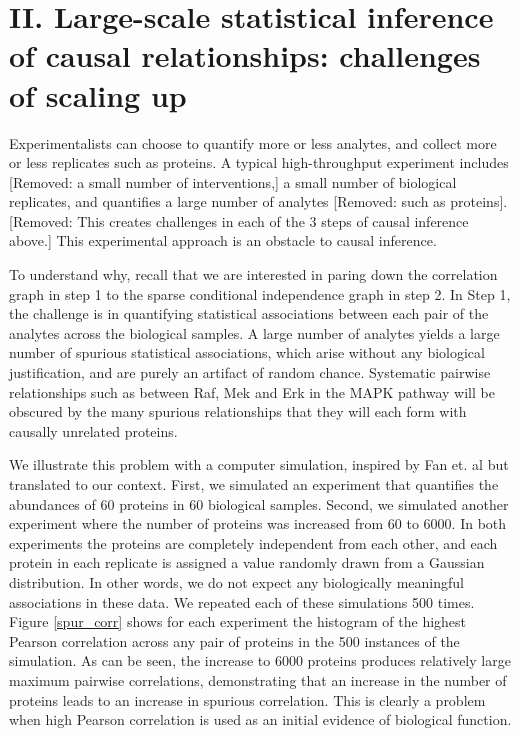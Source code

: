 \documentclass[journal=jacsat,manuscript=article]{achemso}
\def\added#1{{\color{blue} #1}}
\def\removed#1{{\color{magenta}[Removed: #1]}}
\begin{document}
\section{II. Large-scale statistical inference of causal relationships: challenges of scaling up}

\added{Experimentalists can choose to quantify more or less analytes, and collect more or less replicates such as proteins.} A typical high-throughput experiment includes \removed{a small number of interventions,} a small number of biological replicates, and quantifies a large number of analytes \removed{such as proteins}. \removed{This creates challenges in each of the 3 steps of causal inference above.}  \added{This experimental approach is an obstacle to causal inference.}

\added{To understand why, recall that we are interested in paring down the correlation graph in step 1 to the sparse conditional independence graph in step 2.}  In Step 1, the challenge is in quantifying statistical associations between each pair of the analytes across the biological samples. A large number of analytes yields a large number of spurious statistical associations, which arise without any biological justification, and are purely an artifact of random chance. Systematic pairwise relationships such as between Raf, Mek and Erk in the MAPK pathway will be obscured by the many spurious relationships that they will each form with causally unrelated proteins.

We illustrate this problem with a computer simulation, inspired by Fan et. al\cite{fan2014challenges} but translated to our context. First, we simulated an experiment that quantifies the abundances of 60 proteins in 60 biological samples. Second, we simulated another experiment where the number of proteins was increased from 60 to 6000. In both experiments the proteins are completely independent from each other, and each protein in each replicate is assigned a value randomly drawn from a Gaussian distribution. In other words, we do not expect any biologically meaningful associations in these data. We repeated each of these simulations 500 times. Figure \ref{spur_corr} shows for each experiment the histogram of the highest Pearson correlation across any pair of proteins in the 500 instances of the simulation. As can be seen, the increase to 6000 proteins produces relatively large maximum pairwise correlations, demonstrating that an increase in the number of proteins leads to an increase in spurious correlation.  This is clearly a problem when high Pearson correlation is used as an initial evidence of biological function.
\end{document}
